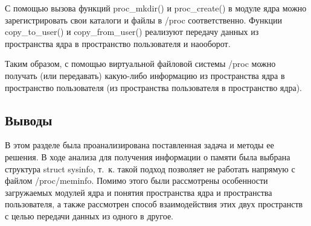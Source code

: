 С помощью вызова функций proc\_mkdir() и proc\_create() в модуле ядра можно зарегистрировать свои каталоги и файлы в /proc соответственно. Функции copy\_to\_user() и copy\_from\_user() реализуют передачу данных из пространства ядра в пространство пользователя и наооборот.

Таким образом, с помощью виртуальной файловой системы /proc можно получать (или передавать) какую-либо информацию из пространства ядра в пространство пользователя (из пространства пользователя в пространство ядра).

\subsection*{Выводы}

В этом разделе была проанализирована поставленная задача и методы ее решения. В ходе анализа для получения информации о памяти была выбрана структура struct sysinfo, т.~к. такой подход позволяет не работать напрямую с файлом /proc/meminfo. Помимо этого были рассмотрены особенности загружаемых модулей ядра и понятия пространства ядра и пространства пользователя, а также рассмотрен способ взаимодействия этих двух пространств с целью передачи данных из одного в другое.


